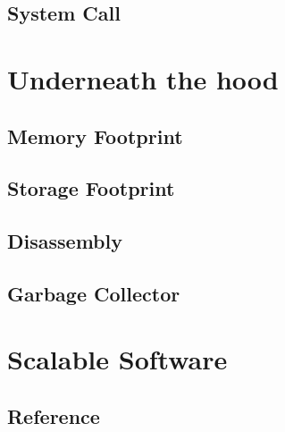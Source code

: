 \documentclass{kdp}
\begin{document}
\chapter{System Call}

\part{Underneath the hood}

\chapter{Memory Footprint}

\chapter{Storage Footprint}

\chapter{Disassembly}

\chapter{Garbage Collector}

\part{Scalable Software}

\chapter{Reference}
\end{document}
